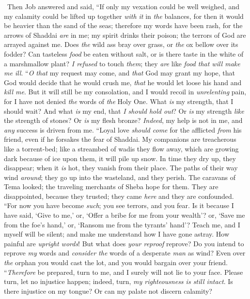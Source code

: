 \begin{biblechapter} %
  Then Job answered and said,
\verse “If only my vexation could be well weighed, 
and my calamity could be lifted up together \textit{with it} in \textit{the} balances,
\verse for then it would be heavier than the sand of the seas; 
therefore my words have been rash,
\verse for the arrows of Shaddai \textit{are} in me; 
my spirit drinks their poison; 
the terrors of God are arrayed against me.
\verse Does \textit{the} wild ass bray over grass, 
or \textit{the} ox bellow over its fodder?
\verse Can tasteless \textit{food} be eaten without salt, 
or is there taste in the white of a marshmallow plant?
\verse \textit{I refused} to touch \textit{them}; 
they \textit{are} like \textit{food that will make me ill}.
\verse “\textit{O that} my request may come, 
and \textit{that} God may grant my hope,
\verse that God would decide that he would crush me, 
\textit{that} he would let loose his hand and \textit{kill me}.
\verse But it will still be my consolation, 
and I would recoil in \textit{unrelenting} pain, 
for I have not denied \textit{the} words of \textit{the} Holy One.
\verse What \textit{is} my strength, that I should wait? 
And what \textit{is} my end, that \textit{I should hold out}?
\verse Or \textit{is} my strength \textit{like} the strength of stones? 
Or \textit{is} my flesh bronze?
\verse \textit{Indeed}, my help is not in me, 
and \textit{any} success is driven from me.
\verse “Loyal love \textit{should come} for the afflicted \textit{from} his friend, 
even if he forsakes the fear of Shaddai.
\verse My companions are treacherous like a torrent-bed; 
like a streambed of wadis they flow away,
\verse which are growing dark because of ice upon them, 
it will pile up snow.
\verse In time they dry up, they disappear; 
when it \textit{is} hot, they vanish from their place.
\verse The paths of their way wind \textit{around}; 
they go up into the wasteland, and they perish.
\verse The caravans of Tema looked; 
the traveling merchants of Sheba hope for them.
\verse They are disappointed, because they trusted; 
they came \textit{here} and they are confounded.
\verse “For now you have become \textit{such}; 
you see terrors, and you fear.
\verse Is it because I have said, ‘Give to me,’ 
or, ‘Offer a bribe for me from your wealth’?
\verse or, ‘Save me from the foe’s hand,’ 
or, ‘Ransom me from the tyrants’ hand’?
\verse Teach me, and I myself will be silent; 
and make me understand how I have gone astray.
\verse How painful are \textit{upright words}! 
But what does \textit{your reproof} reprove?
\verse Do you intend to reprove \textit{my} words 
and \textit{consider the} words of a desperate \textit{man} as wind?
\verse Even over \textit{the} orphan you would cast the lot, 
and you would bargain over your friend.
\verse “\textit{Therefore} be prepared, turn to me, 
and I surely will not lie to your face.
\verse Please turn, let no injustice happen; 
indeed, turn, \textit{my righteousness is still intact}.
\verse Is there injustice on my tongue? 
Or can my palate not discern calamity?
\end{biblechapter}

